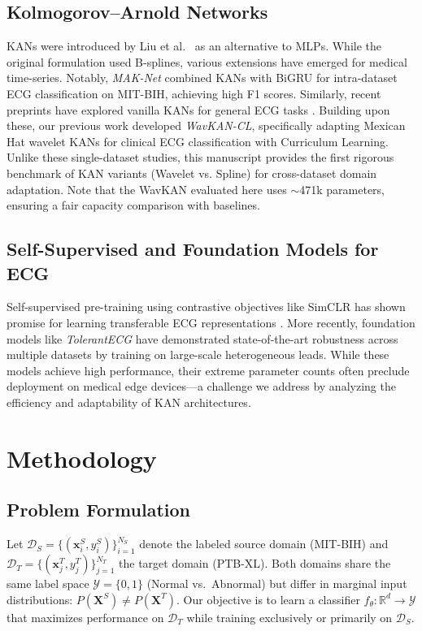 \documentclass[journal,twoside,web]{ieeecolor}
\begin{document}
\subsection{Kolmogorov--Arnold Networks}
KANs were introduced by Liu et al.\ \cite{liu2024kan} as an alternative to MLPs. While the original formulation used B-splines, various extensions have emerged for medical time-series. Notably, \textit{MAK-Net} \cite{maknet2025} combined KANs with BiGRU for intra-dataset ECG classification on MIT-BIH, achieving high F1 scores. Similarly, recent preprints have explored vanilla KANs for general ECG tasks \cite{medrxivkan2024}. Building upon these, our previous work \cite{manivannan2024wavkancl} developed \textit{WavKAN-CL}, specifically adapting Mexican Hat wavelet KANs for clinical ECG classification with Curriculum Learning. Unlike these single-dataset studies, this manuscript provides the first rigorous benchmark of KAN variants (Wavelet vs. Spline) for cross-dataset domain adaptation. Note that the WavKAN evaluated here uses $\sim$471k parameters, ensuring a fair capacity comparison with baselines.

\subsection{Self-Supervised and Foundation Models for ECG}
Self-supervised pre-training using contrastive objectives like SimCLR \cite{chen2020simple} has shown promise for learning transferable ECG representations \cite{mehari2022self}. More recently, foundation models like \textit{TolerantECG} \cite{tolerantecg2025} have demonstrated state-of-the-art robustness across multiple datasets by training on large-scale heterogeneous leads. While these models achieve high performance, their extreme parameter counts often preclude deployment on medical edge devices—a challenge we address by analyzing the efficiency and adaptability of KAN architectures.

\section{Methodology}

\subsection{Problem Formulation}
Let $\mathcal{D}_S = \{(\mathbf{x}_i^S, y_i^S)\}_{i=1}^{N_S}$ denote the labeled source domain (MIT-BIH) and $\mathcal{D}_T = \{(\mathbf{x}_j^T, y_j^T)\}_{j=1}^{N_T}$ the target domain (PTB-XL). Both domains share the same label space $\mathcal{Y} = \{0, 1\}$ (Normal vs.\ Abnormal) but differ in marginal input distributions: $P(\mathbf{X}^S) \neq P(\mathbf{X}^T)$. Our objective is to learn a classifier $f_\theta: \mathbb{R}^{d} \to \mathcal{Y}$ that maximizes performance on $\mathcal{D}_T$ while training exclusively or primarily on $\mathcal{D}_S$.
\end{document}
